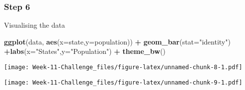 \documentclass[
]{article}
\newenvironment{Shaded}{\begin{snugshade}}{\end{snugshade}}
\newcommand{\AttributeTok}[1]{\textcolor[rgb]{0.13,0.29,0.53}{#1}}
\newcommand{\FunctionTok}[1]{\textcolor[rgb]{0.13,0.29,0.53}{\textbf{#1}}}
\newcommand{\NormalTok}[1]{#1}
\newcommand{\SpecialCharTok}[1]{\textcolor[rgb]{0.81,0.36,0.00}{\textbf{#1}}}
\newcommand{\StringTok}[1]{\textcolor[rgb]{0.31,0.60,0.02}{#1}}
\begin{document}
\hypertarget{step-6}{%
\subsubsection{Step 6}\label{step-6}}

Visualising the data

\begin{Shaded}
\begin{Highlighting}[]
\FunctionTok{ggplot}\NormalTok{(data, }\FunctionTok{aes}\NormalTok{(}\AttributeTok{x=}\NormalTok{state,}\AttributeTok{y=}\NormalTok{population)) }\SpecialCharTok{+} \FunctionTok{geom\_bar}\NormalTok{(}\AttributeTok{stat=}\StringTok{"identity"}\NormalTok{) }\SpecialCharTok{+}\FunctionTok{labs}\NormalTok{(}\AttributeTok{x=}\StringTok{"States"}\NormalTok{,}\AttributeTok{y=}\StringTok{"Population"}\NormalTok{) }\SpecialCharTok{+} \FunctionTok{theme\_bw}\NormalTok{()}
\end{Highlighting}
\end{Shaded}

\texttt{[image: Week-11-Challenge\_files/figure-latex/unnamed-chunk-8-1.pdf]}

\begin{Shaded}
\end{Shaded}

\texttt{[image: Week-11-Challenge\_files/figure-latex/unnamed-chunk-9-1.pdf]}
\end{document}
